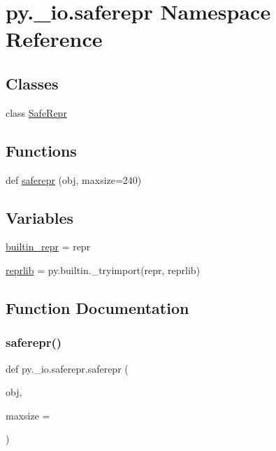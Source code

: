 \hypertarget{namespacepy_1_1__io_1_1saferepr}{}\section{py.\+\_\+io.\+saferepr Namespace Reference}
\label{namespacepy_1_1__io_1_1saferepr}
\subsection*{Classes}
\begin{DoxyCompactItemize}
\item 
class \hyperlink{classpy_1_1__io_1_1saferepr_1_1_safe_repr}{Safe\+Repr}
\end{DoxyCompactItemize}
\subsection*{Functions}
\begin{DoxyCompactItemize}
\item 
def \hyperlink{namespacepy_1_1__io_1_1saferepr_a46c869895a42c6e1bcd1c2f58c4c21fc}{saferepr} (obj, maxsize=240)
\end{DoxyCompactItemize}
\subsection*{Variables}
\begin{DoxyCompactItemize}
\item 
\hyperlink{namespacepy_1_1__io_1_1saferepr_a35b1d3868dd7cfcc70e8788fece2e56b}{builtin\+\_\+repr} = repr
\item 
\hyperlink{namespacepy_1_1__io_1_1saferepr_a056f331714e1b0a438d229e6fb9040ff}{reprlib} = py.\+builtin.\+\_\+tryimport(\textquotesingle{}repr\textquotesingle{}, \textquotesingle{}reprlib\textquotesingle{})
\end{DoxyCompactItemize}


\subsection{Function Documentation}
\mbox{\label{namespacepy_1_1__io_1_1saferepr_a46c869895a42c6e1bcd1c2f58c4c21fc}} 
\subsubsection{\texorpdfstring{saferepr()}{saferepr()}}
{\footnotesize\ttfamily def py.\+\_\+io.\+saferepr.\+saferepr (\begin{DoxyParamCaption}\item[{}]{obj,  }\item[{}]{maxsize = {} }\end{DoxyParamCaption})}

